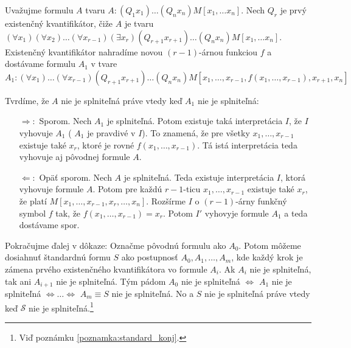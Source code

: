 \begin{dokaz}
    Uvažujme formulu $A$ tvaru $A: (Q_1 x_1) \dots (Q_n x_n) M[x_1, \dots x_n]$.
    Nech $Q_r$ je prvý existenčný kvantifikátor, čiže $A$ je tvaru
    $(\forall x_1) (\forall x_2) \dots (\forall x_{r-1}) (\exists x_r)
     (Q_{r+1} x_{r+1}) \dots (Q_n x_n) M[x_1, \dots x_n]$.
    Existenčný kvantifikátor nahradíme novou $(r-1)$-árnou funkciou $f$ a
    dostávame formulu $A_1$ v tvare
    \begin{equation*}
        A_1: (\forall x_1) \dots (\forall x_{r-1}) (Q_{r+1} x_{r+1})  \dots (Q_n x_n)
                M[x_1, \dots, x_{r-1}, f(x_1, \dots, x_{r-1}), x_{r+1}, x_n]
    \end{equation*}

    \noindent Tvrdíme, že $A$ nie je splniteľná práve vtedy keď $A_1$ nie je splniteľná:
    \begin{itemize}
    \item[$\Rightarrow:$] Sporom. Nech $A_1$ je splniteľná.
        Potom  existuje taká interpretácia $I$, 
        že $I$ vyhovuje $A_1$ ( $A_1$ je pravdivé v $I$).
        To znamená, že pre všetky $x_1 , \dots, x_{r-1}$ existuje také $x_r$,
        ktoré je rovné $f(x_1, \dots, x_{r-1})$.
        Tá istá interpretácia teda vyhovuje aj pôvodnej formule $A$.

    \item[$\Leftarrow:$] Opäť sporom. Nech $A$ je splniteľná.
        Teda existuje interpretácia $I$, ktorá vyhovuje formule $A$.
        Potom pre každú $r-1$-ticu $x_1, \dots, x_{r-1}$ 
        existuje také $x_r$, že platí 
        $M[x_1, \dots, x_{r-1}, x_r, \dots, x_n]$.
        Rozšírme $I$ o $(r-1)$-árny funkčný 
        symbol $f$ tak, že $f(x_1, \dots, x_{r-1}) = x_r$. Potom $I'$
        vyhovyje formule $A_1$ a teda dostávame spor.
    \end{itemize}

    \noindent Pokračujme ďalej v dôkaze:
    Označme pôvodnú formulu ako $A_0$. Potom môžeme dosiahnuť štandardnú formu
    $S$ ako postupnosť $A_0, A_1, \dots, A_m$, kde každý krok je zámena prvého
    existenčného kvantifikátora vo formule $A_i$.
    Ak $A_i$ nie je splniteľná, tak ani $A_{i+1}$ nie je splniteľná.
    Tým pádom $A_0$ nie je splniteľná $\iff$ $A_1$ nie je splniteľná $\iff
    \dots \iff$ $A_m\equiv S$ nie je splniteľná.
    No a $S$ nie je splniteľná práve vtedy keď $\mathscr{S}$ nie je
    splniteľná.\footnote{Viď poznámku \ref{poznamka:standard_konj}.}
    \\
\end{dokaz}

